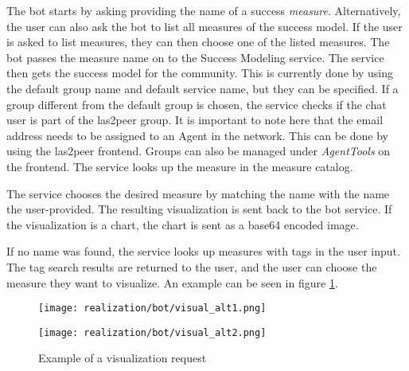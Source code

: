 The bot starts by asking providing the name of a success \emph{measure}. Alternatively, the user can also ask the bot to list all measures of the success model.
If the user is asked to list measures, they can then choose one of the listed measures. 
The bot passes the measure name on to the Success Modeling service. The service then gets the success model for the community. This is currently done by using the default group name and default service name, but they can be specified.
If a group different from the default group is chosen, the service checks if the chat user is part of the las2peer group. 
It is important to note here that the email address needs to be assigned to an Agent in the network. 
This can be done by using the las2peer frontend. 
Groups can also be managed under \emph{AgentTools} on the frontend.  
The service looks up the measure in the measure catalog. 

The service chooses the desired measure by matching the name with the name the user-provided. 
The resulting visualization is sent back to the bot service. If the visualization is a chart, the chart is sent as a base64 encoded image.

If no name was found, the service looks up measures with tags in the user input. The tag search results are returned to the user, and the user can choose the measure they want to visualize.
An example can be seen in figure \ref{fig:visualReq}.

\begin{figure}[h]
    \begin{minipage}[t]{0.5\textwidth}
    
\vspace{0pt}

        \texttt{[image: realization/bot/visual\_alt1.png]} 
    \end{minipage}
    \begin{minipage}[t]{0.5\textwidth}

\vspace{0pt}

        \texttt{[image: realization/bot/visual\_alt2.png]}
    \end{minipage}
    \caption{Example of a visualization request}
    \label{fig:visualReq}
\end{figure}


